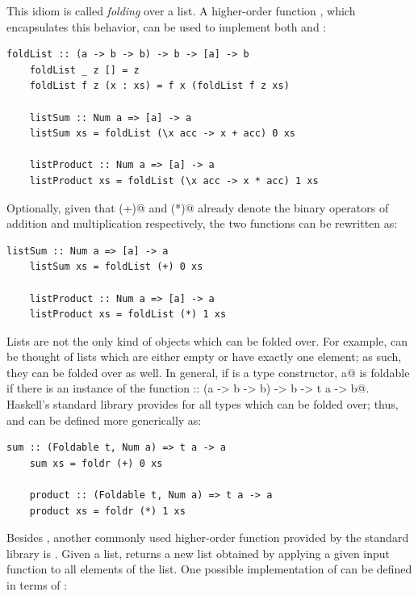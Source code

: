 \documentclass[UdineBachThesis,american,11pt]{PhdThesis}
\begin{document}
  This idiom is called \emph{folding} over a list. A higher-order function
  \lstinline@foldList@, which encapsulates this behavior, can be used to
  implement both \lstinline@listSum@ and \lstinline@listProduct@:

  \begin{lstlisting}[gobble=4,basicstyle=\ttfamily\small]
    foldList :: (a -> b -> b) -> b -> [a] -> b
    foldList _ z [] = z
    foldList f z (x : xs) = f x (foldList f z xs)

    listSum :: Num a => [a] -> a
    listSum xs = foldList (\x acc -> x + acc) 0 xs

    listProduct :: Num a => [a] -> a
    listProduct xs = foldList (\x acc -> x * acc) 1 xs
  \end{lstlisting}

  Optionally, given that \lstinline@(+)@ and \lstinline@(*)@ already denote the
  binary operators of addition and multiplication respectively, the two
  functions can be rewritten as:

  \begin{lstlisting}[gobble=4,basicstyle=\ttfamily\small]
    listSum :: Num a => [a] -> a
    listSum xs = foldList (+) 0 xs

    listProduct :: Num a => [a] -> a
    listProduct xs = foldList (*) 1 xs
  \end{lstlisting}

  Lists are not the only kind of objects which can be folded over. For example,
  \lstinline@Maybe@s can be thought of lists which are either empty or have
  exactly one element; as such, they can be folded over as well. In general, if
  \lstinline@t@ is a type constructor, \lstinline@t a@ is foldable if there is
  an instance of the function
  \lstinline@foldr :: (a -> b -> b) -> b -> t a -> b@. Haskell's standard
  library provides \lstinline@foldr@ for all types which can be folded over;
  thus, \lstinline@listSum@ and \lstinline@listProduct@ can be defined more
  generically as:

  \begin{lstlisting}[gobble=4,basicstyle=\ttfamily\small]
    sum :: (Foldable t, Num a) => t a -> a
    sum xs = foldr (+) 0 xs

    product :: (Foldable t, Num a) => t a -> a
    product xs = foldr (*) 1 xs
  \end{lstlisting}

  Besides \lstinline@foldr@, another commonly used higher-order function
  provided by the standard library is \lstinline@map@. Given a list,
  \lstinline@map@ returns a new list obtained by applying a given input function
  to all elements of the list. One possible implementation of \lstinline@map@
  can be defined in terms of \lstinline@foldr@:
\end{document}
